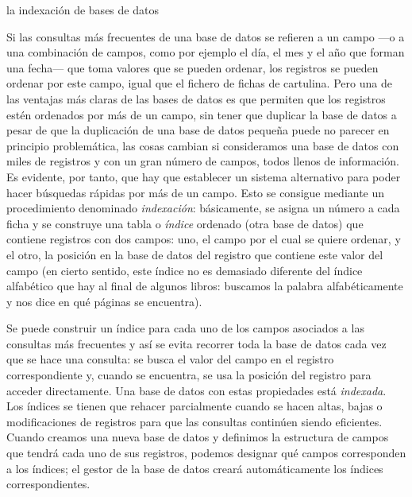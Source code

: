 \begin{persabermes}{la indexación de bases de datos} 

Si las consultas más frecuentes de una base de datos se refieren a un campo ---o a una combinación de campos, como por ejemplo el día, el mes y el año que forman una fecha--- que toma valores que se pueden ordenar, los registros se pueden ordenar por este campo, igual que el fichero de fichas de cartulina. Pero una de las ventajas más claras de las bases de datos es que permiten que los registros estén ordenados por más de un campo, sin tener que duplicar la base de datos a pesar de que la duplicación de una base de datos pequeña puede no parecer en principio problemática, las cosas cambian si consideramos una base de datos con miles de registros y con un gran número de campos, todos llenos de información. Es evidente, por tanto, que hay que establecer un sistema alternativo para poder hacer búsquedas rápidas por más de un campo. Esto se consigue mediante un procedimiento denominado \emph{indexación}: básicamente, se asigna un número a cada ficha y se construye una tabla o \emph{índice} ordenado (otra base de datos) que contiene registros con dos campos: uno, el campo por el cual se quiere ordenar, y el otro, la posición en la base de datos del registro que contiene este valor del campo (en cierto sentido, este índice no es demasiado diferente del índice alfabético que hay al final de algunos libros: buscamos la palabra alfabéticamente y nos dice en qué páginas se encuentra). 

Se puede construir un índice para cada uno de los campos asociados a las consultas más frecuentes y así se evita recorrer toda la base de datos cada vez que se hace una consulta: se busca el valor del campo en el registro correspondiente y, cuando se encuentra, se usa la posición del registro para acceder directamente. Una base de datos con estas propiedades está \emph{indexada}. 
Los índices se tienen que rehacer parcialmente cuando se hacen altas, bajas o modificaciones de registros para que las consultas continúen siendo eficientes. Cuando creamos una nueva base de datos y definimos la estructura de campos que tendrá cada uno de sus registros, podemos designar qué campos corresponden a los índices; el gestor de la base de datos creará automáticamente los índices correspondientes. 


\end{persabermes}
